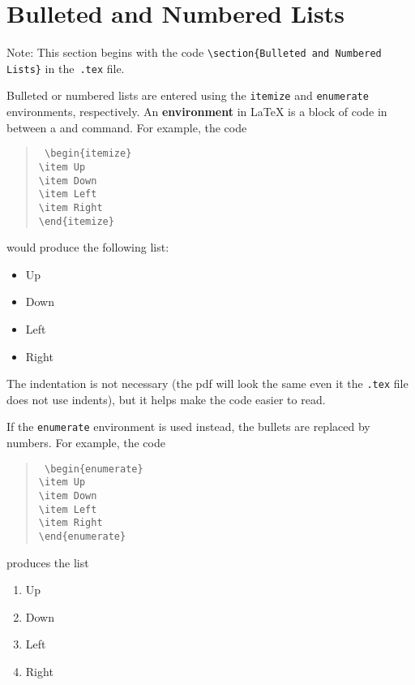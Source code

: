 \section{Bulleted and Numbered Lists}
Note: This section begins with the code 
\texttt{\textbackslash{}section\{Bulleted and Numbered Lists\}} in 
the~\texttt{.tex} file.

Bulleted or numbered lists are entered using the \texttt{itemize} and 
\texttt{enumerate} environments, respectively. An \textbf{environment} in 
\LaTeX{} is a block of code in between a  and  command. For 
example, the code
\begin{quote}\tt
	\textbackslash{}begin\{itemize\} \\[-0.5em]
	\hspace*{2em}\textbackslash{}item Up \\[-0.5em]
	\hspace*{2em}\textbackslash{}item Down \\[-0.5em]
	\hspace*{2em}\textbackslash{}item Left \\[-0.5em]
	\hspace*{2em}\textbackslash{}item Right \\[-0.5em]
	\textbackslash{}end\{itemize\}
\end{quote}
would produce the following list:
\begin{itemize} \item Up \item Down \item Left \item Right \end{itemize}
The indentation is not necessary (the pdf will look the same even it the 
\texttt{.tex} file does not use indents), but it helps make the code easier to 
read.

If the \texttt{enumerate} environment is used instead, the bullets are replaced 
by numbers. For example, the code
\begin{quote}\tt
	\textbackslash{}begin\{enumerate\} \\[-0.5em]
	\hspace*{2em}\textbackslash{}item Up \\[-0.5em]
	\hspace*{2em}\textbackslash{}item Down \\[-0.5em]
	\hspace*{2em}\textbackslash{}item Left \\[-0.5em]
	\hspace*{2em}\textbackslash{}item Right \\[-0.5em]
	\textbackslash{}end\{enumerate\}
\end{quote}
produces the list
\begin{enumerate} \item Up \item Down \item Left \item Right \end{enumerate}

